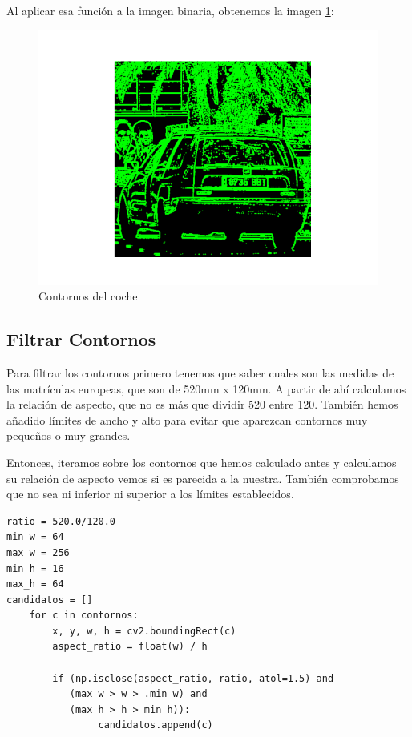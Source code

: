 Al aplicar esa función a la imagen binaria, obtenemos la imagen \ref{coche1Contornos}:
\begin{figure}[H]
    \centering
    \includegraphics[width=.6\linewidth]{Images/coche1Contornos.png}
    \caption{Contornos del coche}
    \label{coche1Contornos}
\end{figure}

\subsection{Filtrar Contornos}
Para filtrar los contornos primero tenemos que saber cuales son las medidas de las matrículas europeas, que son de 520mm x 120mm. A partir de ahí calculamos la relación de aspecto, que no es más que dividir 520 entre 120. También hemos añadido límites de ancho y alto para evitar que aparezcan contornos muy pequeños o muy grandes.

Entonces, iteramos sobre los contornos que hemos calculado antes y calculamos su relación de aspecto vemos si es parecida a la nuestra. También comprobamos que no sea ni inferior ni superior a los límites establecidos.

\newpage

\begin{verbatim}
ratio = 520.0/120.0 
min_w = 64
max_w = 256
min_h = 16
max_h = 64
candidatos = []
    for c in contornos:
        x, y, w, h = cv2.boundingRect(c)
        aspect_ratio = float(w) / h

        if (np.isclose(aspect_ratio, ratio, atol=1.5) and
           (max_w > w > .min_w) and
           (max_h > h > min_h)):
                candidatos.append(c)
\end{verbatim}


